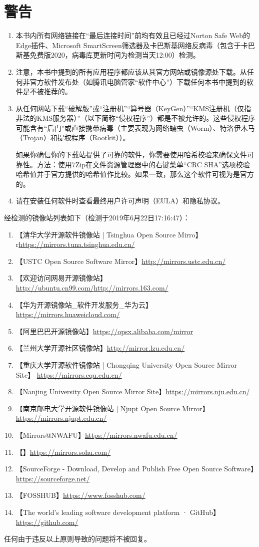 \section{警告}
\begin{enumerate}
\item 本书内所有网络链接在“最后连接时间”前均有效且已经过Norton Safe Web的Edge插件、Microsoft SmartScreen筛选器及卡巴斯基网络反病毒（包含于卡巴斯基免费版2020，病毒库更新时间为检测当天12:00）检测。 
\item 注意，本书中提到的所有应用程序都应该从其官方网站或镜像源处下载。从任何非官方软件发布处（如腾讯电脑管家“软件中心”）下载任何本书中提到的软件是不被推荐的。\par 
\item 从任何网站下载“破解版”或“注册机”“算号器（KeyGen）”“KMS注册机（仅指非法的KMS服务器）”（以下简称“侵权程序”）都是不被允许的。这些侵权程序可能含有“后门”或直接携带病毒（主要表现为网络蠕虫（Worm）、特洛伊木马（Trojan）和提权程序（Rootkit））\cite{HR1}\cite{HR2}\cite{HR3}\cite{HR4}\cite{HR5}。\par
如果你确信你的下载站提供了可靠的软件，你需要使用哈希校验来确保文件可靠性。方法：使用7Zip在文件资源管理器中的右键菜单“CRC SHA”选项校验哈希值并于官方提供的哈希值作比较。如果一致，那么这个软件可视为是官方的。
\item 请在安装任何软件时查看最终用户许可声明（EULA）和隐私协议。
\end{enumerate}
经检测的镜像站列表如下（检测于2019年6月22日17:16:47）：
\begin{enumerate}
	\item 【清华大学开源软件镜像站 | Tsinghua Open Source Mirro】r\url{https://mirrors.tuna.tsinghua.edu.cn/}
	\item 【USTC Open Source Software Mirror】\url{http://mirrors.ustc.edu.cn/}
	\item 【欢迎访问网易开源镜像站】\url{http://ubuntu.cn99.com/}\url{http://mirrors.163.com/}
	\item 【华为开源镜像站\_软件开发服务\_华为云】\url{https://mirrors.huaweicloud.com/}
	\item 【阿里巴巴开源镜像站】\url{https://opsx.alibaba.com/mirror}
	\item 【兰州大学开源社区镜像站】\url{http://mirror.lzu.edu.cn/}
	\item 【重庆大学开源软件镜像站 | Chongqing University Open Source Mirror Site】 \url{https://mirrors.cqu.edu.cn/}
	\item 【Nanjing University Open Source Mirror Site】\url{https://mirrors.nju.edu.cn/}
	\item 【南京邮电大学开源软件镜像站 | Njupt Open Source Mirror】\url{https://mirrors.njupt.edu.cn/}
	\item 【Mirrors@NWAFU】\url{https://mirrors.nwafu.edu.cn/}
	\item 【】\url{https://mirrors.sohu.com/}
	\item 【SourceForge - Download, Develop and Publish Free Open Source Software】\url{https://sourceforge.net/}
	\item 【FOSSHUB】\url{https://www.fosshub.com/}
	\item 【The world’s leading software development platform · GitHub】\url{https://github.com/}
\end{enumerate}
任何由于违反以上原则导致的问题将不被回复。

